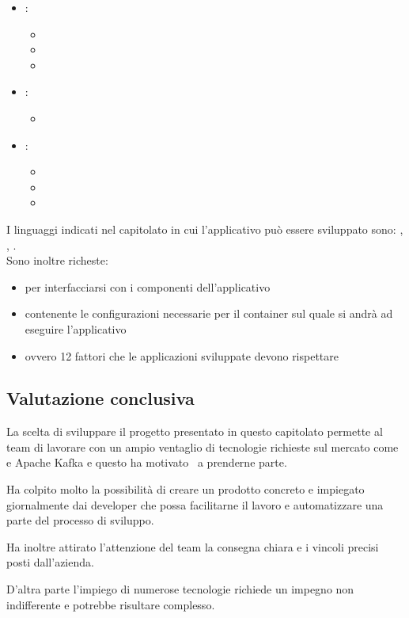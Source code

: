     \begin{itemize}
        \item {}:
        \begin{itemize}
            \item {}
            \item {}
            \item {}
        \end{itemize}
        \item {}:
        \begin{itemize}
            \item {}
        \end{itemize}
        \item {}:
        \begin{itemize}
            \item {}
            \item {}
            \item {}
        \end{itemize}
    \end{itemize}
    I linguaggi indicati nel capitolato in cui l'applicativo può essere sviluppato sono: , , .\\
    Sono inoltre richeste:
    \begin{itemize}
        \item {} per interfacciarsi con i componenti dell'applicativo
        \item {} contenente le configurazioni necessarie per il container sul quale si andrà ad eseguire l'applicativo
        \item {} ovvero 12 fattori che le applicazioni sviluppate devono rispettare
    \end{itemize}

    \subsection{Valutazione conclusiva}
    La scelta di sviluppare il progetto presentato in questo capitolato permette al team di lavorare con un ampio ventaglio di tecnologie
    richieste sul mercato come  e Apache Kafka e questo ha motivato \gruppo\ a prenderne parte.\par
    Ha colpito molto la possibilità di creare un prodotto concreto e impiegato giornalmente dai developer che possa facilitarne il lavoro
    e automatizzare una parte del processo di sviluppo.\par
    Ha inoltre attirato l'attenzione del team la consegna chiara e i vincoli precisi posti dall'azienda.\par
    D'altra parte l'impiego di numerose tecnologie richiede un impegno non indifferente e potrebbe risultare complesso.
